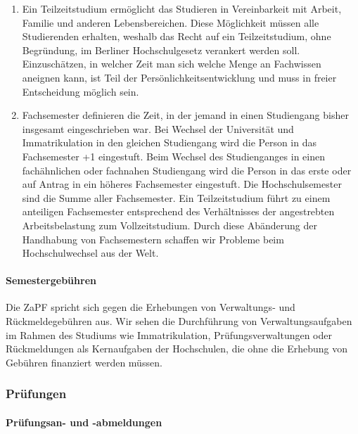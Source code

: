 \begin{enumerate}
\item
  Ein Teilzeitstudium ermöglicht das Studieren in Vereinbarkeit mit
  Arbeit, Familie und anderen Lebensbereichen. Diese Möglichkeit müssen
  alle Studierenden erhalten, weshalb das Recht auf ein Teilzeitstudium,
  ohne Begründung, im Berliner Hochschulgesetz verankert werden soll.
  Einzuschätzen, in welcher Zeit man sich welche Menge an Fachwissen
  aneignen kann, ist Teil der Persönlichkeitsentwicklung und muss in
  freier Entscheidung möglich sein.
\item
  Fachsemester definieren die Zeit, in der jemand in einen Studiengang
  bisher insgesamt eingeschrieben war. Bei Wechsel der Universität und
  Immatrikulation in den gleichen Studiengang wird die Person in das
  Fachsemester +1 eingestuft. Beim Wechsel des Studienganges in einen
  fachähnlichen oder fachnahen Studiengang wird die Person in das erste
  oder auf Antrag in ein höheres Fachsemester eingestuft. Die
  Hochschulsemester sind die Summe aller Fachsemester. Ein
  Teilzeitstudium führt zu einem anteiligen Fachsemester entsprechend
  des Verhältnisses der angestrebten Arbeitsbelastung zum
  Vollzeitstudium. Durch diese Abänderung der Handhabung von
  Fachsemestern schaffen wir Probleme beim Hochschulwechsel aus der
  Welt.
\end{enumerate}

\hypertarget{semestergebuxfchren}{%
\paragraph{Semestergebühren}\label{semestergebuxfchren}}

Die ZaPF spricht sich gegen die Erhebungen von Verwaltungs- und
Rückmeldegebühren aus. Wir sehen die Durchführung von
Verwaltungsaufgaben im Rahmen des Studiums wie Immatrikulation,
Prüfungsverwaltungen oder Rückmeldungen als Kernaufgaben der
Hochschulen, die ohne die Erhebung von Gebühren finanziert werden
müssen.

\hypertarget{pruxfcfungen}{%
\subsubsection{Prüfungen}\label{pruxfcfungen}}

\hypertarget{pruxfcfungsan--und--abmeldungen}{%
\paragraph{Prüfungsan- und
-abmeldungen}\label{pruxfcfungsan--und--abmeldungen}}

